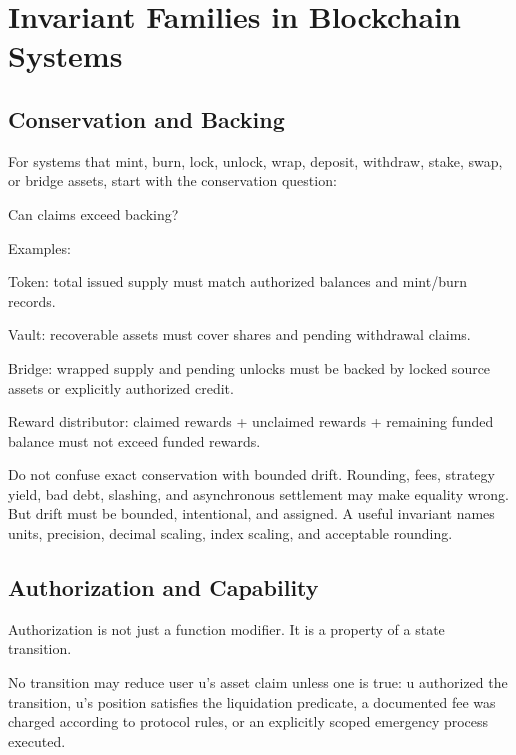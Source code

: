 \section{Invariant Families in Blockchain Systems}

\subsection{Conservation and Backing}

For systems that mint, burn, lock, unlock, wrap, deposit, withdraw, stake, swap, or bridge assets, start with the conservation question:

\begin{codeblock}
Can claims exceed backing?
\end{codeblock}

Examples:

\begin{codeblock}
Token:
    total issued supply must match authorized balances and mint/burn records.

Vault:
    recoverable assets must cover shares and pending withdrawal claims.

Bridge:
    wrapped supply and pending unlocks must be backed by locked source
    assets or explicitly authorized credit.

Reward distributor:
    claimed rewards + unclaimed rewards + remaining funded balance
    must not exceed funded rewards.
\end{codeblock}

Do not confuse exact conservation with bounded drift. Rounding, fees, strategy yield, bad debt, slashing, and asynchronous settlement may make equality wrong. But drift must be bounded, intentional, and assigned. A useful invariant names units, precision, decimal scaling, index scaling, and acceptable rounding.

\subsection{Authorization and Capability}

Authorization is not just a function modifier. It is a property of a state transition.

\begin{codeblock}
No transition may reduce user u's asset claim unless one is true:
    u authorized the transition,
    u's position satisfies the liquidation predicate,
    a documented fee was charged according to protocol rules,
    or an explicitly scoped emergency process executed.
\end{codeblock}

